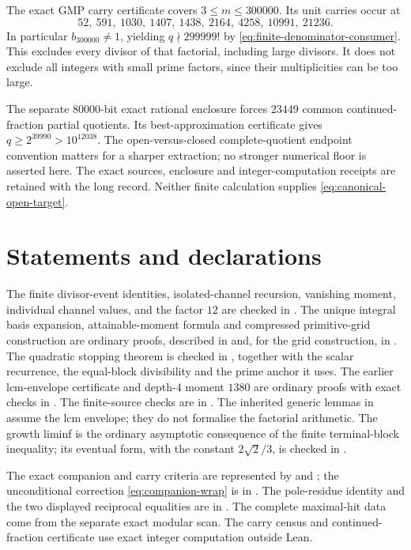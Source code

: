 \documentclass[11pt]{article}
\begin{document}
The exact GMP carry certificate covers $3\le m\le300000$.  Its unit carries
occur at
\[
52,\ 591,\ 1030,\ 1407,\ 1438,\ 2164,\ 4258,\ 10991,\ 21236.
\]
In particular $b_{300000}\ne1$, yielding $q\nmid299999!$ by
\eqref{eq:finite-denominator-consumer}.  This excludes every divisor of that
factorial, including large divisors.  It does not exclude all integers with
small prime factors, since their multiplicities can be too large.

The separate $80000$-bit exact rational enclosure forces $23449$ common
continued-fraction partial quotients.  Its best-approximation certificate gives
$q\ge2^{39990}>10^{12038}$.  The open-versus-closed complete-quotient endpoint
convention matters for a sharper extraction; no stronger numerical floor is
asserted here.  The exact sources, enclosure and integer-computation receipts
are retained with the long record.  Neither finite calculation supplies
\eqref{eq:canonical-open-target}.

\section*{Statements and declarations}\label{app:sources}

\begingroup\small\raggedright
The finite divisor-event identities, isolated-channel recursion, vanishing
moment, individual channel values, and the factor $12$ are checked in
.  The unique integral basis expansion,
attainable-moment formula and compressed primitive-grid construction are
ordinary proofs, described in  and, for the
grid construction, in
.  The quadratic stopping theorem
is checked in , together with the
scalar recurrence, the equal-block divisibility and the prime anchor it uses.
The earlier lcm-envelope certificate and depth-$4$ moment $1380$ are
ordinary proofs with exact checks in .
The finite-source checks are in .
The inherited generic lemmas in  assume
the lcm envelope; they do not formalise the factorial arithmetic.
The growth liminf is the
ordinary asymptotic consequence of the finite terminal-block inequality; its
eventual form, with the constant $2\sqrt2/3$, is checked in
.

The exact companion and carry criteria are represented by
 and
; the unconditional correction
\eqref{eq:companion-wrap} is in .
The pole-residue identity and the two displayed reciprocal equalities are
in .  The complete maximal-hit data come from
the separate exact modular scan.  The carry census and continued-fraction
certificate use exact integer computation outside Lean.
\end{document}

